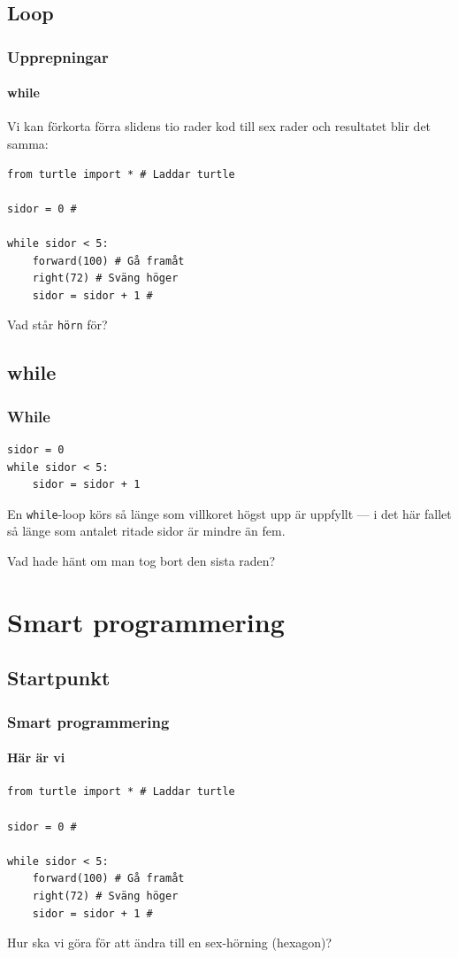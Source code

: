 \documentclass[aspectratio=169]{beamer}
\begin{document}
\subsection{Loop}

\begin{frame}[fragile]
	\frametitle{Upprepningar}
	\framesubtitle{while}
	
	Vi kan förkorta förra slidens tio rader kod till sex rader och resultatet blir det samma:
	
	\begin{lstlisting}
from turtle import * # Laddar turtle

sidor = 0 # 

while sidor < 5: 
    forward(100) # Gå framåt
    right(72) # Sväng höger
    sidor = sidor + 1 #
	\end{lstlisting}
	
Vad står \texttt{hörn} för?

\end{frame}

\subsection{while}

\begin{frame}[fragile]
	\frametitle{While}
	
	\begin{lstlisting}
sidor = 0
while sidor < 5:
    sidor = sidor + 1
	\end{lstlisting}
	
	En \lstinline{while}-loop körs så länge som villkoret högst upp är uppfyllt --- i det här fallet så länge som antalet ritade sidor är mindre än fem.
	
	\pause
	
	Vad hade hänt om man tog bort den sista raden?
	
\end{frame}

\section{Smart programmering}

\subsection{Startpunkt}

\begin{frame}[fragile]
	\frametitle{Smart programmering}
	\framesubtitle{Här är vi}
	
	
	\begin{lstlisting}
from turtle import * # Laddar turtle

sidor = 0 # 

while sidor < 5: 
    forward(100) # Gå framåt
    right(72) # Sväng höger
    sidor = sidor + 1 #
	\end{lstlisting}
	
	Hur ska vi göra för att ändra till en sex-hörning (hexagon)?

\end{frame}
\end{document}
